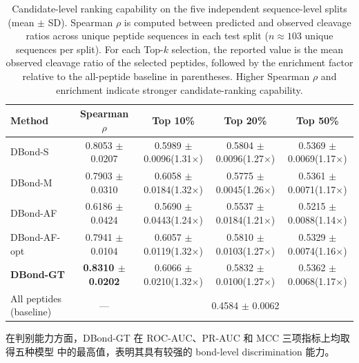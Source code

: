 \begin{table}[t]
\centering
\caption{Candidate-level ranking capability on the five independent
sequence-level splits (mean $\pm$ SD). Spearman $\rho$ is computed between
predicted and observed cleavage ratios across unique peptide sequences in
each test split ($n \approx 103$ unique sequences per split). For each
Top-$k$ selection, the reported value is the mean observed cleavage ratio
of the selected peptides, followed by the enrichment factor relative to the
all-peptide baseline in parentheses. Higher Spearman $\rho$ and enrichment
indicate stronger candidate-ranking capability.}
\label{tab:ranking}
\begin{tabular}{lcccc}
\toprule
Method        & Spearman $\rho$        & Top 10\%              & Top 20\%              & Top 50\%              \\
\midrule
DBond-S       & 0.8053 $\pm$ 0.0207   & 0.5989 $\pm$ 0.0096\;(1.31$\times$)  & 0.5804 $\pm$ 0.0096\;(1.27$\times$)  & 0.5369 $\pm$ 0.0069\;(1.17$\times$)  \\
DBond-M       & 0.7903 $\pm$ 0.0310   & 0.6058 $\pm$ 0.0184\;(1.32$\times$)  & 0.5775 $\pm$ 0.0045\;(1.26$\times$)  & 0.5361 $\pm$ 0.0071\;(1.17$\times$)  \\
DBond-AF      & 0.6186 $\pm$ 0.0424   & 0.5690 $\pm$ 0.0443\;(1.24$\times$)  & 0.5537 $\pm$ 0.0184\;(1.21$\times$)  & 0.5215 $\pm$ 0.0088\;(1.14$\times$)  \\
DBond-AF-opt  & 0.7941 $\pm$ 0.0104   & 0.6057 $\pm$ 0.0119\;(1.32$\times$)  & 0.5810 $\pm$ 0.0103\;(1.27$\times$)  & 0.5329 $\pm$ 0.0074\;(1.16$\times$)  \\
\midrule
\textbf{DBond-GT}
              & \textbf{0.8310 $\pm$ 0.0202}
              & 0.6066 $\pm$ 0.0210\;(1.32$\times$)
              & 0.5832 $\pm$ 0.0100\;(1.27$\times$)
              & 0.5362 $\pm$ 0.0068\;(1.17$\times$) \\
\midrule
All peptides (baseline)
              & ---
              & \multicolumn{3}{c}{0.4584 $\pm$ 0.0062} \\
\bottomrule
\end{tabular}
\end{table}

在判别能力方面，DBond-GT 在 ROC-AUC、PR-AUC 和 MCC 三项指标上均取得五种模型
中的最高值，表明其具有较强的 bond-level discrimination 能力。

